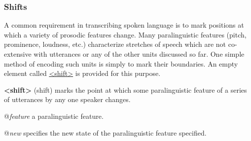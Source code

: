 \subsubsection[{Shifts}]{Shifts}\label{TSSASH}\par
A common requirement in transcribing spoken language is to mark positions at which a variety of prosodic features change. Many paralinguistic features (pitch, prominence, loudness, etc.) characterize stretches of speech which are not co-extensive with utterances or any of the other units discussed so far. One simple method of encoding such units is simply to mark their boundaries. An empty element called \hyperref[TEI.shift]{<shift>} is provided for this purpose. 
\begin{sansreflist}
  
\item [\textbf{<shift>}] (shift) marks the point at which some paralinguistic feature of a series of utterances by any one speaker changes.\hfil\\[-10pt]\begin{sansreflist}
    \item[@{\itshape feature}]
  a paralinguistic feature.
    \item[@{\itshape new}]
  specifies the new state of the paralinguistic feature specified.
\end{sansreflist}  
\end{sansreflist}
